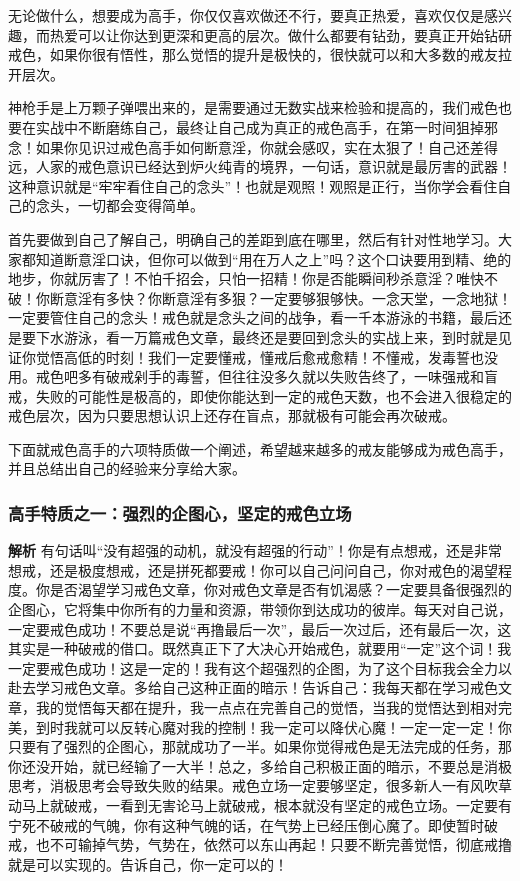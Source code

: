 无论做什么，想要成为高手，你仅仅喜欢做还不行，要真正热爱，喜欢仅仅是感兴趣，而热爱可以让你达到更深和更高的层次。做什么都要有钻劲，要真正开始钻研戒色，如果你很有悟性，那么觉悟的提升是极快的，很快就可以和大多数的戒友拉开层次。

神枪手是上万颗子弹喂出来的，是需要通过无数实战来检验和提高的，我们戒色也要在实战中不断磨练自己，最终让自己成为真正的戒色高手，在第一时间狙掉邪念！如果你见识过戒色高手如何断意淫，你就会感叹，实在太狠了！自己还差得远，人家的戒色意识已经达到炉火纯青的境界，一句话，意识就是最厉害的武器！这种意识就是“牢牢看住自己的念头”！也就是观照！观照是正行，当你学会看住自己的念头，一切都会变得简单。

首先要做到自己了解自己，明确自己的差距到底在哪里，然后有针对性地学习。大家都知道断意淫口诀，但你可以做到“用在万人之上”吗？这个口诀要用到精、绝的地步，你就厉害了！不怕千招会，只怕一招精！你是否能瞬间秒杀意淫？唯快不破！你断意淫有多快？你断意淫有多狠？一定要够狠够快。一念天堂，一念地狱！一定要管住自己的念头！戒色就是念头之间的战争，看一千本游泳的书籍，最后还是要下水游泳，看一万篇戒色文章，最终还是要回到念头的实战上来，到时就是见证你觉悟高低的时刻！我们一定要懂戒，懂戒后愈戒愈精！不懂戒，发毒誓也没用。戒色吧多有破戒剁手的毒誓，但往往没多久就以失败告终了，一味强戒和盲戒，失败的可能性是极高的，即使你能达到一定的戒色天数，也不会进入很稳定的戒色层次，因为只要思想认识上还存在盲点，那就极有可能会再次破戒。

下面就戒色高手的六项特质做一个阐述，希望越来越多的戒友能够成为戒色高手，并且总结出自己的经验来分享给大家。

\subsubsection{高手特质之一：强烈的企图心，坚定的戒色立场}

\textbf{解析} 有句话叫“没有超强的动机，就没有超强的行动”！你是有点想戒，还是非常想戒，还是极度想戒，还是拼死都要戒！你可以自己问问自己，你对戒色的渴望程度。你是否渴望学习戒色文章，你对戒色文章是否有饥渴感？一定要具备很强烈的企图心，它将集中你所有的力量和资源，带领你到达成功的彼岸。每天对自己说，一定要戒色成功！不要总是说“再撸最后一次”，最后一次过后，还有最后一次，这其实是一种破戒的借口。既然真正下了大决心开始戒色，就要用“一定”这个词！我一定要戒色成功！这是一定的！我有这个超强烈的企图，为了这个目标我会全力以赴去学习戒色文章。多给自己这种正面的暗示！告诉自己：我每天都在学习戒色文章，我的觉悟每天都在提升，我一点点在完善自己的觉悟，当我的觉悟达到相对完美，到时我就可以反转心魔对我的控制！我一定可以降伏心魔！一定一定一定！你只要有了强烈的企图心，那就成功了一半。如果你觉得戒色是无法完成的任务，那你还没开始，就已经输了一大半！总之，多给自己积极正面的暗示，不要总是消极思考，消极思考会导致失败的结果。戒色立场一定要够坚定，很多新人一有风吹草动马上就破戒，一看到无害论马上就破戒，根本就没有坚定的戒色立场。一定要有宁死不破戒的气魄，你有这种气魄的话，在气势上已经压倒心魔了。即使暂时破戒，也不可输掉气势，气势在，依然可以东山再起！只要不断完善觉悟，彻底戒撸就是可以实现的。告诉自己，你一定可以的！


